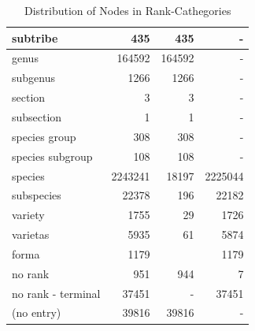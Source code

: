 \begin{table}[h!]
\begin{center}
\begin{tabular}{ |l|r||r|r| }
          subtribe & 435                      & 435 & - \\ \hline
          \setrow{\bfseries}genus & 164592    & 164592 & - \\
          subgenus & 1266                     & 1266 & - \\
          section & 3                         & 3 & - \\
          subsection & 1                      & 1 & - \\
          species group & 308                 & 308 & - \\
          species subgroup & 108              & 108 & - \\ \hline
          \setrow{\bfseries}species & 2243241 & 18197 & 2225044 \\
          subspecies & 22378                  & 196 & 22182 \\
          variety & 1755                      & 29 & 1726 \\
          varietas & 5935                     & 61 & 5874 \\
          forma & 1179                        & & 1179 \\
          \hline \hline
          no rank & 951                       & 944 & 7 \\
          no rank - terminal & 37451          & - & 37451 \\
          (no entry) & 39816                  & 39816 & - \\
          \hline  
        \end{tabular}
        \caption{Distribution of Nodes in Rank-Cathegories}
        \label{table:taxa} 
      \end{center}  
    \end{table}

\newpage

